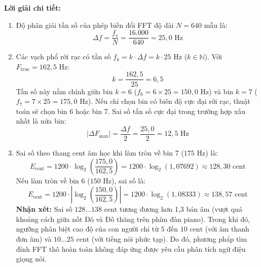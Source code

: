 \noindent\textbf{Lời giải chi tiết:}
\begin{enumerate}[label=\alph*)]
    \item Độ phân giải tần số của phép biến đổi FFT độ dài $N = 640$ mẫu là:
    \begin{equation}
        \Delta f = \frac{f_s}{N} = \frac{16.000}{640} = 25{,}0\text{ Hz}
    \end{equation}

    \item Các vạch phổ rời rạc có tần số $f_k = k \cdot \Delta f = k \cdot 25\text{ Hz}$ ($k \in \mathbb{N}$). Với $F_{\text{true}} = 162{,}5\text{ Hz}$:
    \begin{equation}
        k = \frac{162{,}5}{25} = 6{,}5
    \end{equation}
    Tần số này nằm chính giữa bin $k = 6$ ($f_6 = 6 \times 25 = 150{,}0\text{ Hz}$) và bin $k = 7$ ($f_7 = 7 \times 25 = 175{,}0\text{ Hz}$). Nếu chỉ chọn bin có biên độ cực đại rời rạc, thuật toán sẽ chọn bin 6 hoặc bin 7. Sai số tần số cực đại trong trường hợp xấu nhất là nửa bin:
    \begin{equation}
        |\Delta F_{\max}| = \frac{\Delta f}{2} = \frac{25{,}0}{2} = 12{,}5\text{ Hz}
    \end{equation}

    \item Sai số theo thang cent âm học khi làm tròn về bin 7 ($175\text{ Hz}$) là:
    \begin{equation}
        E_{\text{cent}} = 1200 \cdot \log_2\left(\frac{175{,}0}{162{,}5}\right) = 1200 \cdot \log_2(1{,}07692) \approx 128{,}30\text{ cent}
    \end{equation}
    Nếu làm tròn về bin 6 ($150\text{ Hz}$), sai số là:
    \begin{equation}
        E_{\text{cent}} = 1200 \cdot \left|\log_2\left(\frac{150{,}0}{162{,}5}\right)\right| = 1200 \cdot \log_2(1{,}08333) \approx 138{,}57\text{ cent}
    \end{equation}
    \textbf{Nhận xét:} Sai số $128 \dots 138\text{ cent}$ tương đương hơn 1,3 bán âm (vượt quá khoảng cách giữa nốt Đô và Đô thăng trên phím đàn piano). Trong khi đó, ngưỡng phân biệt cao độ của con người chỉ từ $5$ đến $10\text{ cent}$ (với âm thanh đơn âm) và $10 \dots 25\text{ cent}$ (với tiếng nói phức tạp). Do đó, phương pháp tìm đỉnh FFT thô hoàn toàn không đáp ứng được yêu cầu phân tích ngữ điệu giọng nói.
\end{enumerate}

